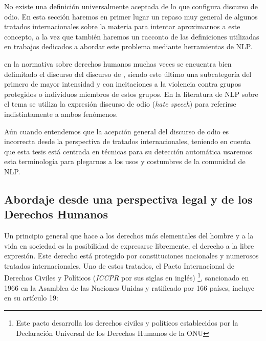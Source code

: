 No existe una definición universalmente aceptada de lo que configura discurso de odio. En esta sección haremos en primer lugar un repaso muy general de algunos tratados internacionales sobre la materia para intentar aproximarnos a este concepto, a la vez que también haremos un racconto de las definiciones utilizadas en trabajos dedicados a abordar este problema mediante herramientas de NLP.

 en la normativa sobre derechos humanos muchas veces se encuentra bien delimitado el discurso  del discurso de , siendo este último una subcategoría del primero de mayor intensidad y con incitaciones a la violencia contra grupos protegidos o individuos miembros de estos grupos. En la literatura de NLP sobre el tema se utiliza la expresión discurso de odio (\emph{hate speech}) para referirse indistintamente a ambos fenómenos.

Aún cuando entendemos que la acepción general del discurso de odio es incorrecta desde la perspectiva de tratados internacionales, teniendo en cuenta que esta tesis está centrada en técnicas para su detección automática usaremos esta terminología para plegarnos a los usos y costumbres de la comunidad de NLP.

\subsection{Abordaje desde una perspectiva legal y de los Derechos Humanos}

Un principio general que hace a los derechos más elementales del hombre y a la vida en sociedad es la posibilidad de expresarse libremente, el derecho a la libre expresión. Este derecho está protegido por constituciones nacionales y numerosos tratados internacionales. Uno de estos tratados, el Pacto Internacional de Derechos Civiles y Políticos (\emph{ICCPR} por sus siglas en inglés) \footnote{Este pacto desarrolla los derechos civiles y políticos establecidos por la Declaración Universal de los Derechos Humanos de la ONU}, sancionado en 1966 en la Asamblea de las Naciones Unidas y ratificado por 166 países, incluye en su artículo 19:

